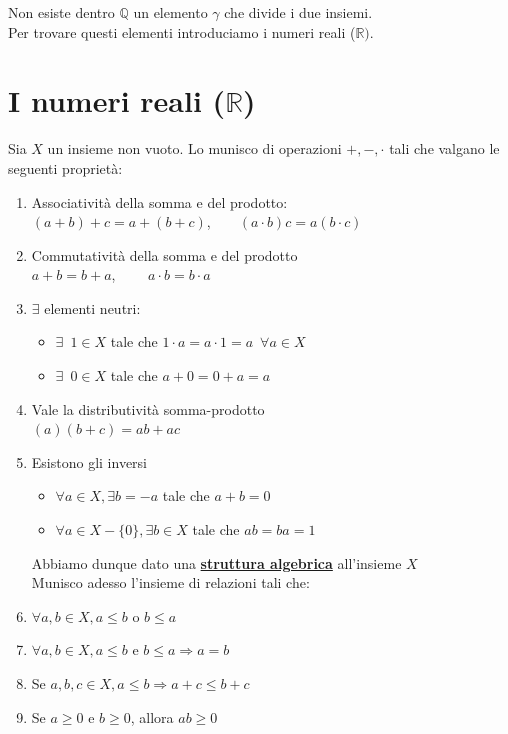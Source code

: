 \documentclass{article}
\theoremstyle{definition}
\begin{document}
Non esiste dentro $\mathbb{Q}$ un elemento $\gamma$ che divide i due insiemi.
\\ Per trovare questi elementi introduciamo i numeri reali ($\mathbb{R}).$

\section{I numeri reali ($\mathbb{R}$)}
Sia $X$ un insieme non vuoto.
Lo munisco di operazioni $+,-,\cdot$ tali che valgano le seguenti proprietà:
\begin{enumerate}
    \item Associatività della somma e del prodotto:
    \\ $(a+b)+c=a+(b+c)$, \,\,\,\,\,\,\,\, $(a \cdot b)c=a(b\cdot c)$
    \item Commutatività della somma e del prodotto
    \\ $a+b=b+a$, \,\,\,\,\,\,\,\,\,\, $a \cdot b=b \cdot a$
    \item $\exists$ elementi neutri:
    \begin{itemize}
        \item $\exists \,\,\, 1 \in X$ tale che $1 \cdot a = a \cdot 1 =a \,\,\, \forall a \in X$
        \item $\exists \,\,\,0 \in X$ tale che $a+0=0+a=a$
    \end{itemize}
    \item Vale la distributività somma-prodotto
    \\ $(a)(b+c)=ab+ac$
    \item Esistono gli inversi
    \begin{itemize}
        \item $\forall a \in X, \exists b=-a$ tale che $a+b=0$
        \item $\forall a \in X-\{0\}, \exists b \in X$ tale che $ab=ba=1$
    \end{itemize}
Abbiamo dunque dato una \underline{\textbf{struttura algebrica}} all'insieme $X$
\\Munisco adesso l'insieme di relazioni tali che:
\item $\forall a,b \in X, a \leqslant b $ o $b \leqslant a$
\item $\forall a,b \in X, a \leqslant b$ e $b \leqslant a \Longrightarrow a=b$
\item Se $a,b,c \in X, a \leqslant b \Longrightarrow a+c \leqslant b+c$
\item Se $a \geqslant 0$ e $b \geqslant 0$, allora $ab \geqslant 0$


\end{enumerate}
\end{document}
